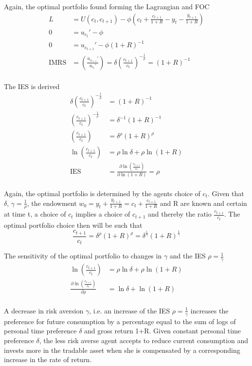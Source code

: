 \documentclass[12pt]{article}
\begin{document}
	Again, the optimal portfolio found forming the Lagrangian and FOC
	\begin{align*}
		L &= U(c_t, c_{t+1})  - \phi \left(c_t + \frac{c_{t+1}}{1+R} - y_t - \frac{y_{t+1}}{1+R}\right)\\
		0 &= u_{c_t}' - \phi\\
		0 & = u_{c_{t+1}}' - \phi (1+R)^{-1}\\
		\text{IMRS} &= \left( \frac{u_{c_{t+1}}'}{u_{c_t}'} \right) = \delta \left(\frac{c_{t+1}}{c_t}\right)^{-\frac{1}{\rho}} = (1+R)^{-1}\\
	\end{align*}

	The IES is derived 
	\begin{align*}
		\delta \left(\frac{c_{t+1}}{c_t}\right)^{-\frac{1}{\rho}} &= (1+R)^{-1}\\
		\left(\frac{c_{t+1}}{c_t}\right)^{-\frac{1}{\rho}} &= \delta^{-1}(1+R)^{-1}\\
		\left(\frac{c_{t+1}}{c_t}\right) &= \delta^{\rho}(1+R)^{\rho}\\
		\ln \left(\frac{c_{t+1}}{c_t}\right) &= \rho \ln \delta + \rho \ln (1+R)\\
		\text{IES} &= \frac{\partial \ln \left(\frac{c_{t+1}}{c_t}\right)}{\partial \ln (1+R)} = \rho\\
	\end{align*}

	Again, the optimal portfolio is determined by the agents choice of $c_t$. Given that $\delta$, $\gamma = \frac{1}{\rho}$, the endowment $w_0 = y_t + \frac{y_{t+1}}{1+R} = c_t + \frac{c_{t+1}}{1+R}$ and R are known and certain at time t, a choice of $c_t$ implies a choice of $c_{t+1}$ and thereby the ratio $\frac{c_{t+1}}{c_t}$. The optimal portfolio choice then will be such that $$\frac{c_{t+1}}{c_t} = \delta^{\rho}(1+R)^{\rho} =  \delta^{\frac{1}{\gamma}}(1+R)^{\frac{1}{\gamma}}$$
	
	The sensitivity of the optimal portfolio to changes in $\gamma$ and the IES $\rho = \frac{1}{\gamma}$
	\begin{align*}
		\ln \left(\frac{c_{t+1}}{c_t}\right) &= \rho \ln \delta + \rho \ln (1+R)\\
		\frac{\partial \ln \left(\frac{c_{t+1}}{c_t}\right)}{\partial \rho} &= \ln \delta + \ln (1+R)\\
	\end{align*}
	
	A decrease in risk aversion $\gamma$, i.e. an increase of the IES $\rho = \frac{1}{\gamma}$ increases the preference for future consumption by a percentage equal to the sum of logs of personal time preference $\delta$ and gross return 1+R. Given constant personal time preference $\delta$, the less risk averse agent accepts to reduce current consumption and invests more in the tradable asset when she is compensated by a corresponding increase in the rate of return. 
	
	
\end{document}
